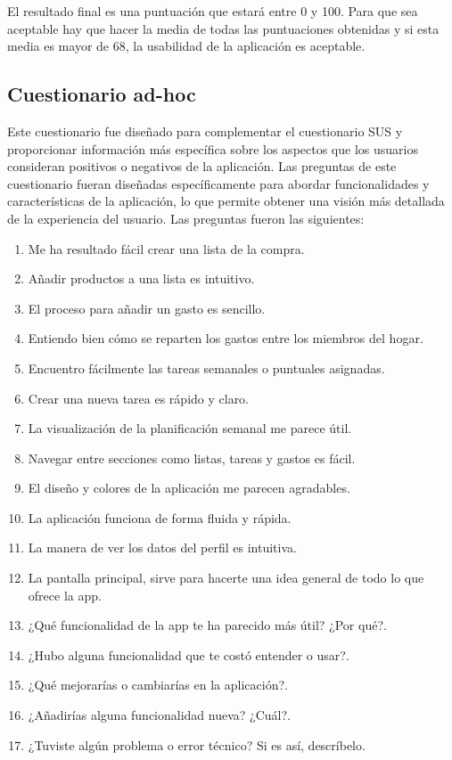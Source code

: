 El resultado final es una puntuación que estará entre 0 y 100. Para que sea aceptable hay que hacer la media de todas las puntuaciones obtenidas y si 
esta media es mayor de 68, la usabilidad de la aplicación es aceptable.

\subsection{Cuestionario ad-hoc}

Este cuestionario fue diseñado para complementar el cuestionario SUS y proporcionar información más específica sobre 
los aspectos que los usuarios consideran positivos o negativos de la aplicación. Las preguntas 
de este cuestionario fueran diseñadas específicamente para abordar funcionalidades y características de la aplicación,
lo que permite obtener una visión más detallada de la experiencia del usuario. Las preguntas fueron las siguientes:

\begin{enumerate}
    \item Me ha resultado fácil crear una lista de la compra.
    \item Añadir productos a una lista es intuitivo.
    \item El proceso para añadir un gasto es sencillo.
    \item Entiendo bien cómo se reparten los gastos entre los miembros del hogar.
    \item Encuentro fácilmente las tareas semanales o puntuales asignadas.
    \item Crear una nueva tarea es rápido y claro.
    \item La visualización de la planificación semanal me parece útil.
    \item Navegar entre secciones como listas, tareas y gastos es fácil.
    \item El diseño y colores de la aplicación me parecen agradables.
    \item La aplicación funciona de forma fluida y rápida.
    \item La manera de ver los datos del perfil es intuitiva.   
    \item La pantalla principal, sirve para hacerte una idea general de todo lo que ofrece la app.
    \item ¿Qué funcionalidad de la app te ha parecido más útil? ¿Por qué?.
    \item ¿Hubo alguna funcionalidad que te costó entender o usar?.
    \item ¿Qué mejorarías o cambiarías en la aplicación?.
    \item ¿Añadirías alguna funcionalidad nueva? ¿Cuál?.
    \item ¿Tuviste algún problema o error técnico? Si es así, descríbelo.


\end{enumerate}

